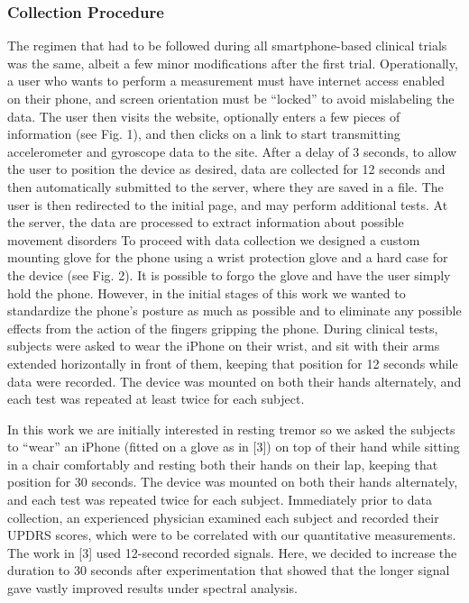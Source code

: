\subsubsection{Collection Procedure}
\label{subsubsec:smartCT1Collection}
The regimen that had to be followed during all smartphone-based clinical trials was the same, albeit a few minor modifications after the first trial. 
Operationally, a user who wants to perform a measurement must have internet access enabled on their phone, and screen orientation must be “locked” to avoid mislabeling the data. The user then visits the website, optionally enters a few pieces of information (see Fig. 1), and then clicks on a link to start transmitting accelerometer and gyroscope data to the site. After a delay of 3 seconds, to allow the user to position the device as desired, data are collected for 12 seconds and then automatically submitted to the server, where they are saved in a file. The user is then redirected to the initial page, and may perform additional tests. At the server, the data are processed to extract information about possible movement disorders
To proceed with data collection we designed a custom mounting glove for the phone using a wrist protection glove and a hard case for the device (see Fig. 2). It is possible to forgo the glove and have the user simply hold the phone. However, in the initial stages of this work we wanted to standardize the phone’s posture as much as possible and to eliminate any possible effects from the action of the fingers gripping the phone.
During clinical tests, subjects were asked to wear the iPhone on their wrist, and sit with their arms extended horizontally in front of them, keeping that position for 12 seconds while data were recorded. The device was mounted on both their hands alternately, and each test was repeated at least twice for each subject. 

In this work we are initially interested in resting tremor so we asked the subjects to “wear” an iPhone (fitted on a glove as in [3]) on top of their hand while sitting in a chair comfortably and resting both their hands on their lap, keeping that position for 30 seconds. The device was mounted on both their hands alternately, and each test was repeated twice for each subject. Immediately prior to data collection, an experienced physician examined each subject and recorded their UPDRS scores, which were to be correlated with our quantitative measurements. 
The work in [3] used 12-second recorded signals. Here, we decided to increase the duration to 30 seconds after experimentation that showed that the longer signal gave vastly improved results under spectral analysis.

